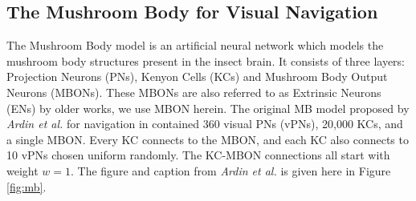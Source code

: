 \documentclass[a4paper,11pt,twoside,openright]{article}
\begin{document}






\subsection{ The Mushroom Body for Visual Navigation } \label{MBBackground}
The Mushroom Body model is an artificial neural network which models
the mushroom body structures present in the insect brain\cite{Ardin2016}. It
consists of three layers: Projection Neurons (PNs), Kenyon Cells (KCs) and
Mushroom Body Output Neurons (MBONs). These MBONs are also referred to as
Extrinsic Neurons (ENs) by older works, we use MBON herein. The original MB model
proposed by \textit{Ardin et al.} for navigation in \cite{Ardin2016} contained
360 visual PNs (vPNs), 20,000 KCs, and a single MBON. Every KC connects to the
MBON, and each KC also connects to 10 vPNs chosen uniform randomly. The KC-MBON
connections all start with weight $w=1$. The figure and caption from
\textit{Ardin et al.} is given here in Figure \ref{fig:mb}.
\end{document}

